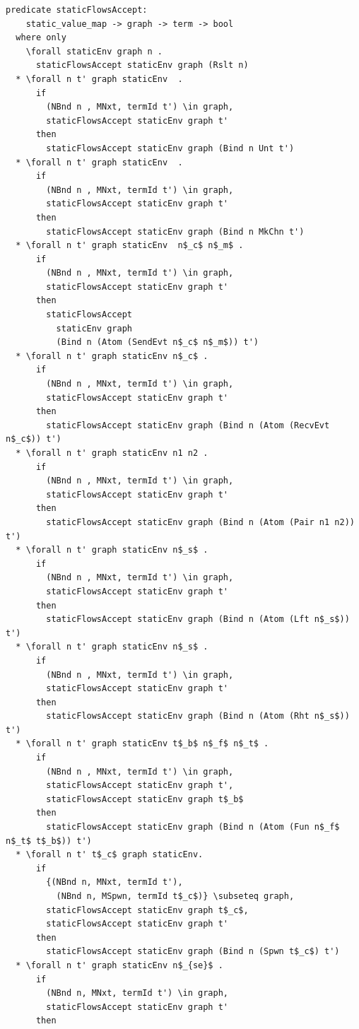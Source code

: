 \documentclass[letterpaper, 11pt]{extarticle}
\begin{document}
\begin{lstlisting}[language=logic, mathescape]
  predicate staticFlowsAccept:
    static_value_map -> graph -> term -> bool
  where only
    \forall staticEnv graph n .
      staticFlowsAccept staticEnv graph (Rslt n)
  * \forall n t' graph staticEnv  .
      if
        (NBnd n , MNxt, termId t') \in graph,
        staticFlowsAccept staticEnv graph t'
      then
        staticFlowsAccept staticEnv graph (Bind n Unt t')
  * \forall n t' graph staticEnv  .
      if
        (NBnd n , MNxt, termId t') \in graph,
        staticFlowsAccept staticEnv graph t'
      then
        staticFlowsAccept staticEnv graph (Bind n MkChn t')
  * \forall n t' graph staticEnv  n$_c$ n$_m$ .
      if
        (NBnd n , MNxt, termId t') \in graph, 
        staticFlowsAccept staticEnv graph t'
      then
        staticFlowsAccept
          staticEnv graph
          (Bind n (Atom (SendEvt n$_c$ n$_m$)) t')
  * \forall n t' graph staticEnv n$_c$ .
      if
        (NBnd n , MNxt, termId t') \in graph,
        staticFlowsAccept staticEnv graph t'
      then
        staticFlowsAccept staticEnv graph (Bind n (Atom (RecvEvt n$_c$)) t')
  * \forall n t' graph staticEnv n1 n2 .
      if
        (NBnd n , MNxt, termId t') \in graph,
        staticFlowsAccept staticEnv graph t'
      then
        staticFlowsAccept staticEnv graph (Bind n (Atom (Pair n1 n2)) t')
  * \forall n t' graph staticEnv n$_s$ .
      if
        (NBnd n , MNxt, termId t') \in graph,
        staticFlowsAccept staticEnv graph t'
      then
        staticFlowsAccept staticEnv graph (Bind n (Atom (Lft n$_s$)) t')
  * \forall n t' graph staticEnv n$_s$ .
      if
        (NBnd n , MNxt, termId t') \in graph,
        staticFlowsAccept staticEnv graph t'
      then
        staticFlowsAccept staticEnv graph (Bind n (Atom (Rht n$_s$)) t')
  * \forall n t' graph staticEnv t$_b$ n$_f$ n$_t$ .
      if
        (NBnd n , MNxt, termId t') \in graph,
        staticFlowsAccept staticEnv graph t', 
        staticFlowsAccept staticEnv graph t$_b$
      then
        staticFlowsAccept staticEnv graph (Bind n (Atom (Fun n$_f$ n$_t$ t$_b$)) t')
  * \forall n t' t$_c$ graph staticEnv.
      if
        {(NBnd n, MNxt, termId t'),
          (NBnd n, MSpwn, termId t$_c$)} \subseteq graph, 
        staticFlowsAccept staticEnv graph t$_c$, 
        staticFlowsAccept staticEnv graph t'
      then
        staticFlowsAccept staticEnv graph (Bind n (Spwn t$_c$) t')
  * \forall n t' graph staticEnv n$_{se}$ .
      if
        (NBnd n, MNxt, termId t') \in graph, 
        staticFlowsAccept staticEnv graph t'
      then

\end{lstlisting}
\end{document}
